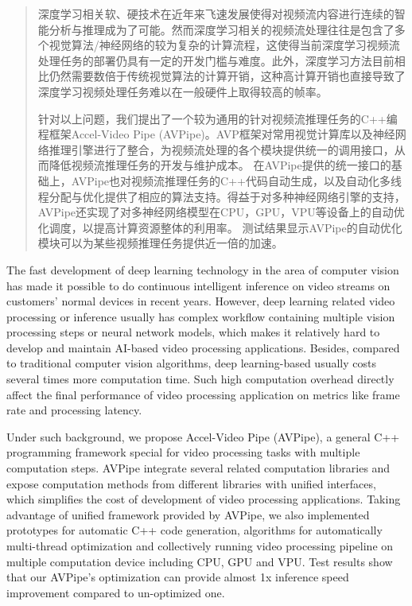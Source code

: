 
\begin{abstract}
深度学习相关软、硬技术在近年来飞速发展使得对视频流内容进行连续的智能分析与推理成为了可能。然而深度学习相关的视频流处理往往是包含了多个视觉算法/神经网络的较为复杂的计算流程，这使得当前深度学习视频流处理任务的部署仍具有一定的开发门槛与难度。此外，深度学习方法目前相比仍然需要数倍于传统视觉算法的计算开销，这种高计算开销也直接导致了深度学习视频处理任务难以在一般硬件上取得较高的帧率。\par
针对以上问题，我们提出了一个较为通用的针对视频流推理任务的C++编程框架Accel-Video Pipe (AVPipe)。AVP框架对常用视觉计算库以及神经网络推理引擎进行了整合，为视频流处理的各个模块提供统一的调用接口，从而降低视频流推理任务的开发与维护成本。
在AVPipe提供的统一接口的基础上，AVPipe也对视频流推理任务的C++代码自动生成，以及自动化多线程分配与优化提供了相应的算法支持。得益于对多种神经网络引擎的支持，AVPipe还实现了对多神经网络模型在CPU，GPU，VPU等设备上的自动优化调度，以提高计算资源整体的利用率。%
测试结果显示AVPipe的自动优化模块可以为某些视频推理任务提供近一倍的加速。
\end{abstract}

\begin{enabstract}
The fast development of deep learning technology in the area of computer vision has made it possible to do continuous intelligent inference on video streams on customers' normal devices in recent years. 
However, deep learning related video processing or inference usually has complex workflow containing multiple vision processing steps or neural network models, which makes it relatively hard to develop and maintain AI-based video processing applications. Besides, compared to traditional computer vision algorithms, deep learning-based usually costs several times more computation time. Such high computation overhead directly affect the final performance of video processing application on metrics like frame rate and processing latency.\par
Under such background, we propose Accel-Video Pipe (AVPipe), a general C++ programming framework special for video processing tasks with multiple computation steps. AVPipe integrate several related computation libraries and expose computation methods from different libraries with unified interfaces, which simplifies the cost of development of video processing applications. Taking advantage of unified framework provided by AVPipe, we also implemented prototypes for automatic C++ code generation, algorithms for automatically multi-thread optimization and collectively running video processing pipeline on multiple computation device including CPU, GPU and VPU. 
Test results show that our AVPipe's optimization can provide almost 1x inference speed improvement compared to un-optimized one.
\end{enabstract}
